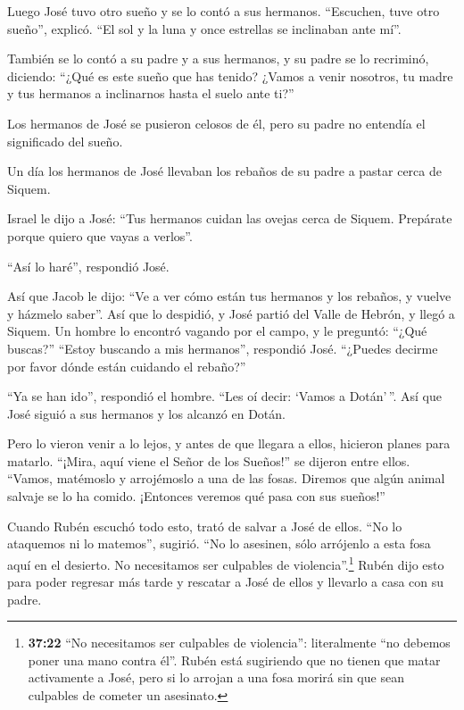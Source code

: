  Luego José tuvo otro sueño y se lo contó a sus hermanos.
``Escuchen, tuve otro sueño'', explicó. ``El sol y la luna y once
estrellas se inclinaban ante mí''.

 También se lo contó a su padre y a sus hermanos, y su
padre se lo recriminó, diciendo: ``¿Qué es este sueño que has tenido?
¿Vamos a venir nosotros, tu madre y tus hermanos a inclinarnos hasta el
suelo ante ti?''

 Los hermanos de José se pusieron celosos de él, pero su
padre no entendía el significado del sueño.

 Un día los hermanos de José llevaban los rebaños de su
padre a pastar cerca de Siquem.

 Israel le dijo a José: ``Tus hermanos cuidan las ovejas
cerca de Siquem. Prepárate porque quiero que vayas a verlos''.

``Así lo haré'', respondió José.

 Así que Jacob le dijo: ``Ve a ver cómo están tus hermanos
y los rebaños, y vuelve y házmelo saber''. Así que lo despidió, y José
partió del Valle de Hebrón,  y llegó a Siquem. Un hombre lo
encontró vagando por el campo, y le preguntó: ``¿Qué buscas?''
 ``Estoy buscando a mis hermanos'', respondió José.
``¿Puedes decirme por favor dónde están cuidando el rebaño?''

 ``Ya se han ido'', respondió el hombre. ``Les oí decir:
`Vamos a Dotán'\,''. Así que José siguió a sus hermanos y los alcanzó en
Dotán.

 Pero lo vieron venir a lo lejos, y antes de que llegara a
ellos, hicieron planes para matarlo.  ``¡Mira, aquí viene
el Señor de los Sueños!'' se dijeron entre ellos.  ``Vamos,
matémoslo y arrojémoslo a una de las fosas. Diremos que algún animal
salvaje se lo ha comido. ¡Entonces veremos qué pasa con sus sueños!''

 Cuando Rubén escuchó todo esto, trató de salvar a José de
ellos.  ``No lo ataquemos ni lo matemos'', sugirió. ``No lo
asesinen, sólo arrójenlo a esta fosa aquí en el desierto. No necesitamos
ser culpables de violencia''.\footnote{\textbf{37:22} ``No necesitamos
  ser culpables de violencia'': literalmente ``no debemos poner una mano
  contra él''. Rubén está sugiriendo que no tienen que matar activamente
  a José, pero si lo arrojan a una fosa morirá sin que sean culpables de
  cometer un asesinato.} Rubén dijo esto para poder regresar más tarde y
rescatar a José de ellos y llevarlo a casa con su padre.

